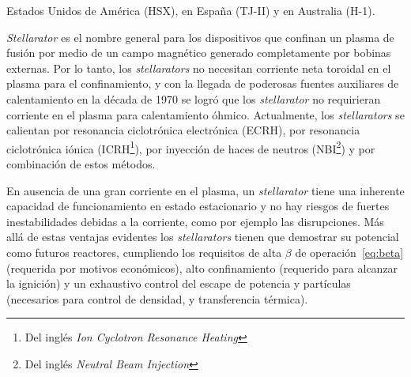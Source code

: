 Estados Unidos de América (HSX), en España (TJ-II) y en Australia (H-1).\par
\textit{Stellarator} es el nombre general para los dispositivos que confinan un plasma de fusión por medio de un campo magnético generado completamente por
bobinas externas. Por lo tanto, los \textit{stellarators} no necesitan corriente neta toroidal en el plasma para el confinamiento, y con la llegada de poderosas
fuentes auxiliares de calentamiento en la década de 1970 se logró que los \textit{stellarator} no requirieran corriente en el plasma para calentamiento óhmico. Actualmente, los \textit{stellarators} se calientan por resonancia ciclotrónica electrónica
(ECRH), por resonancia ciclotrónica iónica (ICRH\footnote{Del inglés \textit{Ion Cyclotron Resonance Heating}}), por inyección de haces
de neutros (NBI\footnote{Del inglés \textit{Neutral Beam Injection}}) y por combinación de estos métodos.\par
En ausencia de una gran corriente en el plasma, un \textit{stellarator} tiene una
inherente capacidad de funcionamiento en estado estacionario y no hay riesgos de fuertes inestabilidades debidas a la corriente, como por ejemplo las
disrupciones. Más allá de estas ventajas evidentes los \textit{stellarators} tienen que
demostrar su potencial como futuros reactores, cumpliendo los requisitos de
alta $\beta$ de operación~\ref{eq:beta}
(requerida por motivos económicos), alto confinamiento (requerido
para alcanzar la ignición) y un exhaustivo control del escape de potencia y
partículas (necesarios para control de densidad, y transferencia térmica).
